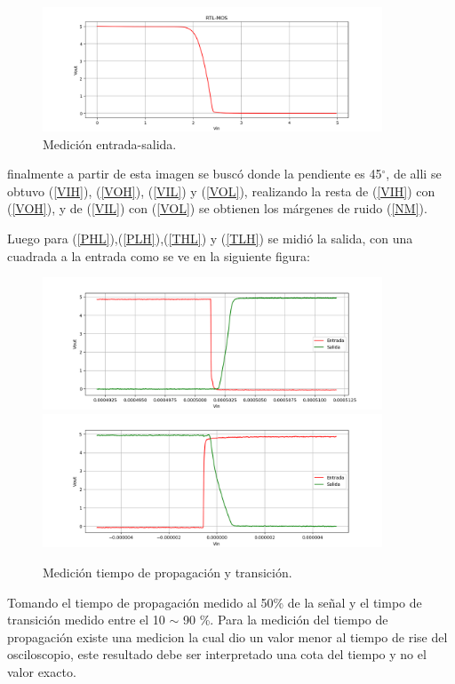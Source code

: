\begin{figure}[H]	
	\centering
	\includegraphics[width=0.9\textwidth]{Imagenes/DC-SWEEP/EntradaSalida.PNG}
	\caption{Medición entrada-salida.}
	\label{fig:medinout}
\end{figure}
finalmente a partir de esta imagen se buscó donde la pendiente es 45$^{\circ}$, de alli se obtuvo (\ref{VIH}), (\ref{VOH}), (\ref{VIL}) y (\ref{VOL}), realizando la resta de (\ref{VIH}) con (\ref{VOH}), y de (\ref{VIL}) con (\ref{VOL}) se obtienen los márgenes de ruido (\ref{NM}).

Luego para (\ref{PHL}),(\ref{PLH}),(\ref{THL}) y (\ref{TLH}) se midió la salida, con una cuadrada a la entrada como se ve en la siguiente figura:
\begin{figure}[H]	
	\centering
	\includegraphics[width=0.9\textwidth]{Imagenes/DC-SWEEP/0t1mtl.PNG}
	\includegraphics[width=0.9\textwidth]{Imagenes/DC-SWEEP/1t0mtl.PNG}
	\caption{Medición tiempo de propagación y transición.}
	\label{fig:MedicionTiempos}
\end{figure}
Tomando el tiempo de propagación medido al 50\% de la señal y el timpo de transición medido entre el 10 $\sim$ 90 \%. Para la medición del tiempo de propagación existe una medicion la cual dio un valor menor al tiempo de rise del osciloscopio, este resultado debe ser interpretado una cota del tiempo y no el valor exacto. 

